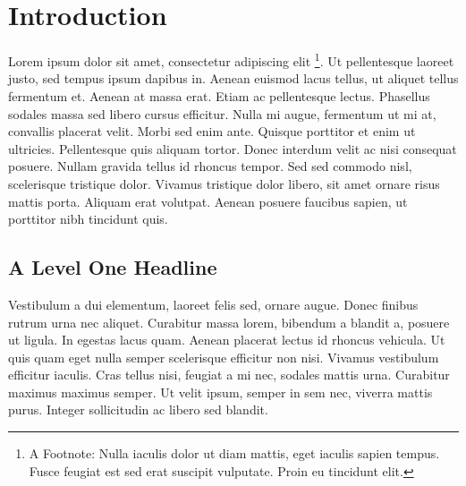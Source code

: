 



\frontmatter
{}




\tableofcontents
\cleardoublepage
\cfoot*{}
\ofoot*{\pagemark}
\mainmatter

\hypertarget{introduction}{%
\chapter{Introduction}\label{introduction}}

Lorem ipsum dolor sit amet, consectetur adipiscing elit \footnote{A
  Footnote: Nulla iaculis dolor ut diam mattis, eget iaculis sapien
  tempus. Fusce feugiat est sed erat suscipit vulputate. Proin eu
  tincidunt elit.}. Ut pellentesque laoreet justo, sed tempus ipsum
dapibus in. Aenean euismod lacus tellus, ut aliquet tellus fermentum et.
Aenean at massa erat. Etiam ac pellentesque lectus. Phasellus sodales
massa sed libero cursus efficitur. Nulla mi augue, fermentum ut mi at,
convallis placerat velit. Morbi sed enim ante. Quisque porttitor et enim
ut ultricies. Pellentesque quis aliquam tortor. Donec interdum velit ac
nisi consequat posuere. Nullam gravida tellus id rhoncus tempor. Sed sed
commodo nisl, scelerisque tristique dolor. Vivamus tristique dolor
libero, sit amet ornare risus mattis porta. Aliquam erat volutpat.
Aenean posuere faucibus sapien, ut porttitor nibh tincidunt
quis.\citep{examplearticle2021}

\hypertarget{a-level-one-headline}{%
\section{A Level One Headline}\label{a-level-one-headline}}

Vestibulum a dui elementum, laoreet felis sed, ornare augue. Donec
finibus rutrum urna nec aliquet. Curabitur massa lorem, bibendum a
blandit a, posuere ut ligula. In egestas lacus quam. Aenean placerat
lectus id rhoncus vehicula. Ut quis quam eget nulla semper scelerisque
efficitur non nisi. Vivamus vestibulum efficitur iaculis. Cras tellus
nisi, feugiat a mi nec, sodales mattis urna. Curabitur maximus maximus
semper. Ut velit ipsum, semper in sem nec, viverra mattis purus. Integer
sollicitudin ac libero sed blandit.

